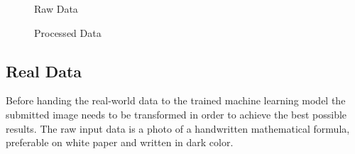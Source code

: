 \documentclass[@CLASSOPTIONS@]{tumarticle}
\begin{document}
\begin{figure}[!htb]
   \begin{minipage}{0.24\textwidth}
     \centering
     \caption{Raw Data}\label{Fig:Data1}
   \end{minipage}\hfill
   \begin{minipage}{0.24\textwidth}
     \centering
     \caption{Processed Data}\label{Fig:Data2}
   \end{minipage}
\end{figure}

\subsection{Real Data}
\label{subsec:realdata}
Before handing the real-world data to the trained machine learning model the submitted image needs
to be transformed in order to achieve the best possible results.
The raw input data is a photo of a handwritten mathematical formula, preferable on white paper
and written in dark color.
\end{document}
